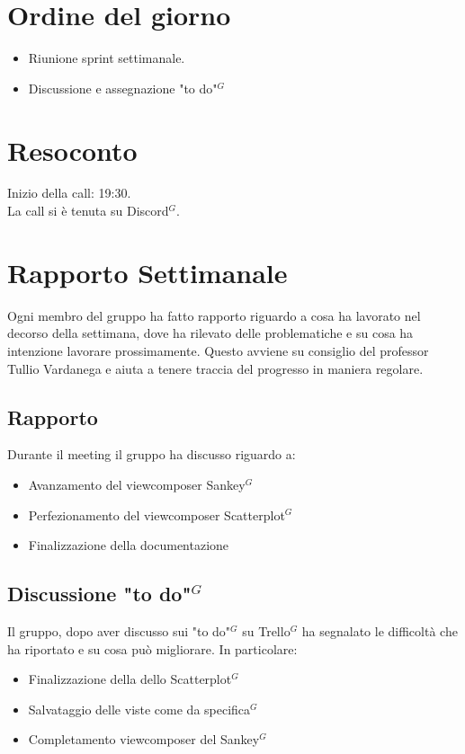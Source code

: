 \section{Ordine del giorno}

\begin{itemize}
	\item Riunione sprint settimanale.
    \item Discussione e assegnazione "to do"$^{G}$ 
\end{itemize}

\section{Resoconto}

\noindent
Inizio della call: 19:30. \\
\noindent La call si è tenuta su Discord$^{G}$.
\section{Rapporto Settimanale}
Ogni membro del gruppo ha fatto rapporto riguardo a cosa ha lavorato nel decorso della settimana, dove ha rilevato delle problematiche e su cosa ha intenzione lavorare prossimamente.
Questo avviene su consiglio del professor Tullio Vardanega e aiuta a tenere traccia del progresso in maniera regolare.

\subsection{Rapporto}
Durante il meeting il gruppo ha discusso riguardo a:
\begin{itemize}
	\item Avanzamento del viewcomposer Sankey$^{G}$
	\item Perfezionamento del viewcomposer Scatterplot$^{G}$
	\item Finalizzazione della documentazione
\end{itemize}

\subsection{Discussione "to do"$^{G}$}
Il gruppo, dopo aver discusso sui "to do"$^{G}$ su Trello$^{G}$ ha segnalato le difficoltà che ha riportato e su cosa può migliorare. In particolare:
\begin{itemize}
	\item Finalizzazione della dello Scatterplot$^{G}$
	\item Salvataggio delle viste come da specifica$^{G}$
	\item Completamento viewcomposer del Sankey$^{G}$
\end{itemize}

